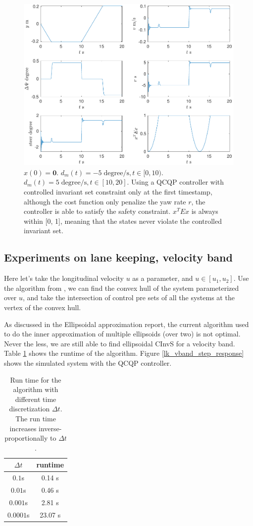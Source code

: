 \documentclass{article}
\begin{document}
\begin{figure}[H]
	\centering
	\includegraphics[width=0.8\linewidth]{lk/step_response.pdf}
	\caption{$x(0) = \mathbf{0}$. $ d_{m}(t) = -5 \; \mathrm{degree/s}, t \in [0,10)$. $d_{m}(t) = 5  \;\mathrm{degree/s}, t \in [10,20] $. Using a QCQP controller with controlled invariant set constraint only at the first timestamp, although the cost function only penalize the yaw rate $r$, the controller is able to satisfy the safety constraint. $x^T E x$ is always within [0, 1], meaning that the states never violate the controlled invariant set.}
	\label{lk_step_response}
\end{figure}


\subsection{Experiments on lane keeping, velocity band}
Here let's take the longitudinal velocity $u$ as a parameter, and $u \in [u_1, u_2]$. Use the algorithm from \cite{lk-cinvs}, we can find the convex hull of the system parameterized over $u$, and take the intersection of control pre sets of all the systems at the vertex of the convex hull.

As discussed in the Ellipsoidal approximation report, the current algorithm used to do the inner approximation of multiple ellipsoids (over two) is not optimal. Never the less, we are still able to find ellipsoidal CInvS for a velocity band. Table \ref{lk_band_runtime} shows the runtime of the algorithm. Figure \ref{lk_vband_step_response} shows the simulated system with the QCQP controller.

\begin{table}[H]
	\centering
	\begin{tabular}{|c|c|}
		\hline
		$\Delta t$ &  runtime \\
		\hline
		$0.1$s & 0.14 s \\
		$0.01$s & 0.46 s \\
		$0.001$s & 2.81 s \\
		$0.0001$s & 23.07 s \\
		\hline
	\end{tabular}
	\caption{Run time for the algorithm with different time discretization $\Delta t$. The run time increases inverse-proportionally to $\Delta t$.}
	\label{lk_band_runtime}
\end{table}
\end{document}

